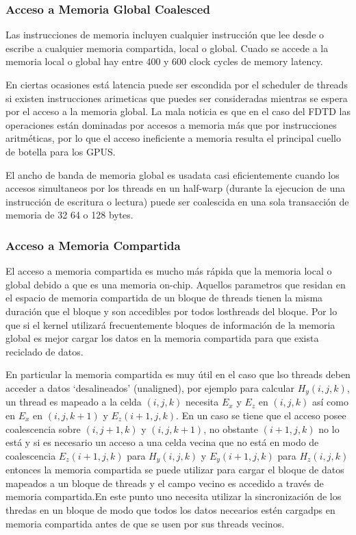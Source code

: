 \documentclass[]{article}
\begin{document}
\subsubsection{Acceso a Memoria Global
Coalesced}\label{acceso-a-memoria-global-coalesced}

Las instrucciones de memoria incluyen cualquier instrucción que lee
desde o escribe a cualquier memoria compartida, local o global. Cuado se
accede a la memoria local o global hay entre 400 y 600 clock cycles de
memory latency.

En ciertas ocasiones está latencia puede ser escondida por el scheduler
de threads si existen instrucciones arimeticas que puedes ser
consideradas mientras se espera por el acceso a la memoria global. La
mala noticia es que en el caso del FDTD las operaciones están dominadas
por accesos a memoria más que por instrucciones aritméticas, por lo que
el acceso ineficiente a memoria resulta el principal cuello de botella
para los GPUS.

El ancho de banda de memoria global es usadata casi eficientemente
cuando los accesos simultaneos por los threads en un half-warp (durante
la ejecucion de una instrucción de escritura o lectura) puede ser
coalescida en una sola transacción de memoria de 32 64 o 128 bytes.

\subsubsection{Acceso a Memoria
Compartida}\label{acceso-a-memoria-compartida}

El acceso a memoria compartida es mucho más rápida que la memoria local
o global debido a que es una memoria on-chip. Aquellos parametros que
residan en el espacio de memoria compartida de un bloque de threads
tienen la misma duración que el bloque y son accedibles por todos
losthreads del bloque. Por lo que si el kernel utilizará frecuentemente
bloques de información de la memoria global es mejor cargar los datos en
la memoria compartida para que exista reciclado de datos.

En particular la memoria compartida es muy útil en el caso que lso
threads deben acceder a datos `desalineados' (unaligned), por ejemplo
para calcular \(H_y(i,j,k)\), un thread es mapeado a la celda
\((i,j,k)\) necesita \(E_x\) y \(E_z\) en \((i,j,k)\) así como en
\(E_x\) en \((i,j,k+1)\) y \(E_z(i+1,j,k)\). En un caso se tiene que el
acceso posee coalescencia sobre \((i,j+1,k)\) y \((i,j,k+1)\), no
obstante \((i+1,j,k)\) no lo está y si es necesario un acceso a una
celda vecina que no está en modo de coalescencia \(E_z(i+1,j,k)\) para
\(H_y(i,j,k)\) y \(E_y(i+1,j,k)\) para \(H_z(i,j,k)\) entonces la
memoria compartida se puede utilizar para cargar el bloque de datos
mapeados a un bloque de threads y el campo vecino es accedido a través
de memoria compartida.En este punto uno necesita utilizar la
sincronización de los thredas en un bloque de modo que todos los datos
necearios estén cargadps en memoria compartida antes de que se usen por
sus threads vecinos.
\end{document}
